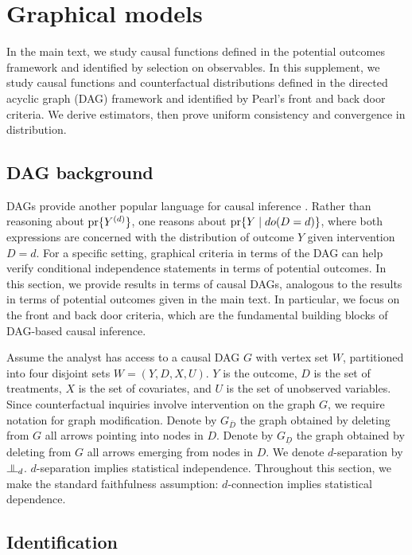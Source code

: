 \section{Graphical models}\label{sec:graphical}

In the main text, we study causal functions defined in the potential outcomes framework and identified by selection on observables. In this supplement, we study causal functions and counterfactual distributions defined in the directed acyclic graph (DAG) framework and identified by Pearl's front and back door criteria. We derive estimators, then prove uniform consistency and convergence in distribution.

\subsection{DAG background}

DAGs provide another popular language for causal inference \cite{pearl2009causality}. Rather than reasoning about $\text{\normalfont pr}\{Y^{(d)}\}$, one reasons about $\text{\normalfont pr}\{Y \mid do(D=d)\}$, where both expressions are concerned with the distribution of outcome $Y$ given intervention $D=d$. For a specific setting, graphical criteria in terms of the DAG can help verify conditional independence statements in terms of potential outcomes. In this section, we provide results in terms of causal DAGs, analogous to the results in terms of potential outcomes given in the main text. In particular, we focus on the front and back door criteria, which are the fundamental building blocks of DAG-based causal inference. 

Assume the analyst has access to a causal DAG $G$ with vertex set $W$, partitioned into four disjoint sets $W=(Y,D,X,U)$. $Y$ is the outcome, $D$ is the set of treatments, $X$ is the set of covariates, and $U$ is the set of unobserved variables. Since counterfactual inquiries involve intervention on the graph $G$, we require notation for graph modification. Denote by $G_{\bar{D}}$ the graph obtained by deleting from $G$ all arrows pointing into nodes in $D$. Denote by $G_{\underline{D}}$ the graph obtained by deleting from $G$ all arrows emerging from nodes in $D$. We denote $d$-separation by $\indep_d$. $d$-separation implies statistical independence. Throughout this section, we make the standard faithfulness assumption: $d$-connection implies statistical dependence. 

\subsection{Identification}

